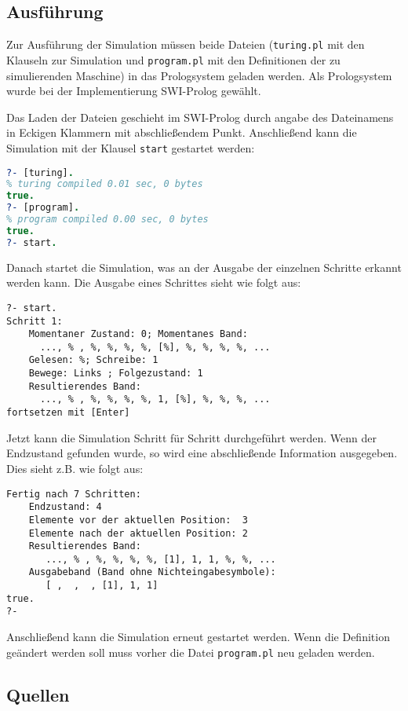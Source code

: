 \documentclass[final,a4paper,11pt,notitlepage,halfparskip]{scrreprt}
\begin{document}
\section{Ausführung}
Zur Ausführung der Simulation müssen beide Dateien (\texttt{turing.pl}
mit den Klauseln zur Simulation und \texttt{program.pl} mit den
Definitionen der zu simulierenden Maschine) in das Prologsystem geladen
werden. Als Prologsystem wurde bei der Implementierung SWI-Prolog
gewählt.  

Das Laden der Dateien geschieht im SWI-Prolog durch angabe des
Dateinamens in Eckigen Klammern mit abschließendem Punkt. Anschließend
kann die Simulation mit der Klausel \texttt{start} gestartet werden:
\begin{lstlisting}[language=Prolog]
?- [turing].
% turing compiled 0.01 sec, 0 bytes
true.
?- [program].
% program compiled 0.00 sec, 0 bytes
true.
?- start.
\end{lstlisting}
Danach startet die Simulation, was an der Ausgabe der einzelnen Schritte
erkannt werden kann. Die Ausgabe eines Schrittes sieht wie folgt aus:
\begin{lstlisting}[]
?- start.
Schritt 1:
    Momentaner Zustand: 0; Momentanes Band:
      ..., % , %, %, %, %, [%], %, %, %, %, ...
    Gelesen: %; Schreibe: 1
    Bewege: Links ; Folgezustand: 1
    Resultierendes Band: 
      ..., % , %, %, %, %, 1, [%], %, %, %, ...
fortsetzen mit [Enter]
\end{lstlisting}
Jetzt kann die Simulation Schritt für Schritt durchgeführt werden. Wenn
der Endzustand gefunden wurde, so wird eine abschließende Information
ausgegeben. Dies sieht z.B. wie folgt aus:
\begin{lstlisting}[]
Fertig nach 7 Schritten:
    Endzustand: 4
    Elemente vor der aktuellen Position:  3
    Elemente nach der aktuellen Position: 2
    Resultierendes Band:
       ..., % , %, %, %, %, [1], 1, 1, %, %, ...
    Ausgabeband (Band ohne Nichteingabesymbole):
       [ ,  ,  , [1], 1, 1]
true.
?- 
\end{lstlisting}
Anschließend kann die Simulation erneut gestartet werden. Wenn die
Definition geändert werden soll muss vorher die Datei
\texttt{program.pl} neu geladen werden.

\pagebreak
\begin{appendix}
    \chapter{Quellen}
    
    \pagebreak
    
\end{appendix}
\end{document}
